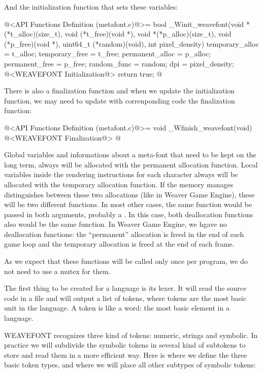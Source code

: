 And the initialization function that sets these variables:

\iniciocodigo
@<API Functions Definition (metafont.c)@>=
bool _Winit_weavefont(void *(*t_alloc)(size_t),
                    void (*t_free)(void *),
                    void *(*p_alloc)(size_t),
                    void (*p_free)(void *),
                    uint64_t (*random)(void), int pixel_density){
  temporary_alloc = t_alloc;
  temporary_free = t_free;
  permanent_alloc = p_alloc;
  permanent_free = p_free;
  random_func = random;
  dpi = pixel_density;
  @<WEAVEFONT Initialization@>
  return true;
}
@
\fimcodigo

There is also a finalization function and when we update the
initialization function, we may need to update with correnponding code
the finalization function:

\iniciocodigo
@<API Functions Definition (metafont.c)@>=
void _Wfinish_weavefont(void){
  @<WEAVEFONT Finalization@>
}
@
\fimcodigo

Global variables and informations about a meta-font that need to be
kept on the long term, always will be allocated with the permanent
allocation function. Local variables inside the rendering instructions
for each character always will be allocated with the temporary
allocation function. If the memory manages distinguishes between these
two allocations (like in Weaver Game Engine), these will be two
different functions. In most other cases, the same function would be
passed in both arguments, probably a . In this
case, both deallocation functions also would be the
same  function. In Weaver Game Engine, we hgave no
deallocation functions: the ``permanent'' allocation is freed in the
end of each game loop and the temporary allocation is freed at the end
of each frame.

As we expect that these functions will be called only once per
program, we do not need to use a mutex for them.



The first thing to be created for a language is its lexer. It will
read the source code in a file and will output a list of tokens, where
tokens are the most basic unit in the language. A token is like a
word: the most basic element in a language.

WEAVEFONT recognizes three kind of tokens: numeric, strings and
symbolic. In practice we will subdivide the symbolic tokens in several
kind of subtokens to store and read them in a more efficient way. Here
is where we define the three basic token types, and where we will
place all other subtypes of symbolic tokens:

